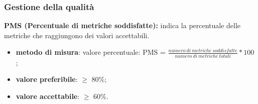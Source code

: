 \subsubsection{Gestione della qualità}
\textbf{PMS (Percentuale di metriche soddisfatte):} indica la percentuale delle metriche che raggiungono dei valori accettabili.
\begin{itemize}
    \item \textbf{metodo di misura}: valore percentuale: PMS = $\frac{numero \ di \ metriche \ soddisfatte}{numero \ di \ metriche \ totali} * 100$ ;
    \item \textbf{valore preferibile}: $\geq$ 80\%;
    \item \textbf{valore accettabile}: $\geq$ 60\%.
\end{itemize}
\newpage
